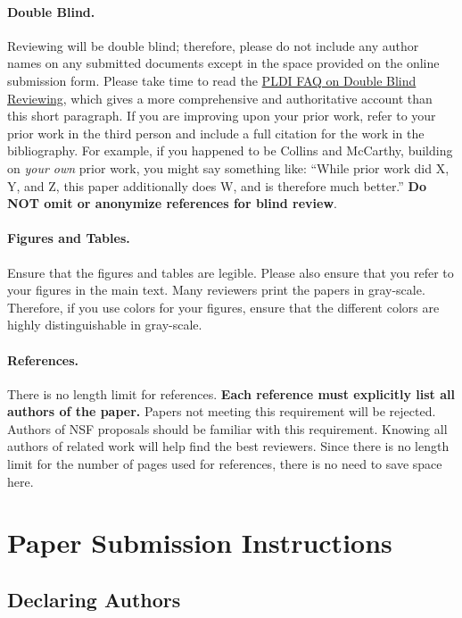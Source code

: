 \documentclass[pldi]{sigplanconf}
\begin{document}
\paragraph{Double Blind.}  Reviewing will be double blind; therefore,
please do not include any author names on any submitted documents
except in the space provided on the online submission form.  Please
take time to read the
\href{http://conf.researchr.org/track/pldi2015/pldi2015-papers#FAQ-on-Double-Blind-Reviewing}{PLDI
  FAQ on Double Blind Reviewing}, which gives a more comprehensive and
authoritative account than this short paragraph.  If you are improving
upon your prior work, refer to your prior work in the third person and
include a full citation for the work in the bibliography. For example,
if you happened to be Collins and McCarthy, building on \emph{your
  own} prior work, you might say something like: ``While prior work
\cite{Backus:60,Collins:60,McCarthy:60} did X, Y, and Z, this paper
additionally does W, and is therefore much better.''  \textbf{Do NOT omit or
anonymize references for blind review}.

\paragraph{Figures and Tables.} Ensure that the figures and tables
are legible.  Please also ensure that you refer to your figures in the main
text.  Many reviewers print the papers in gray-scale. Therefore, if you use
colors for your figures, ensure that the different colors are highly
distinguishable in gray-scale.

\paragraph{References.}  There is no length limit for references.
\textbf{Each reference must explicitly list all authors of the paper.}
  Papers not meeting this requirement will be rejected. Authors of
NSF proposals should be familiar with this requirement. Knowing all
authors of related work will help find the best reviewers. Since there
is no length limit for the number of pages used for references, there
is no need to save space here.

\section{Paper Submission Instructions}

\subsection{Declaring Authors}
\end{document}
